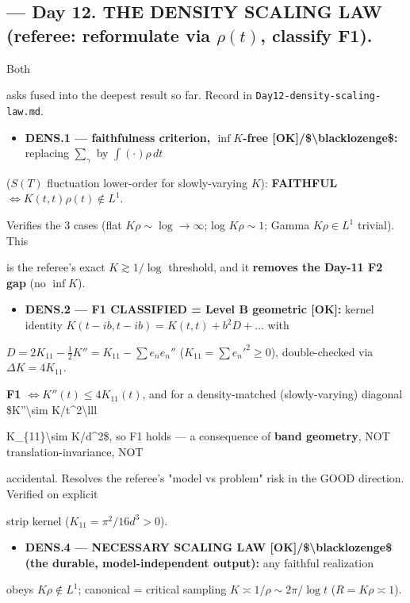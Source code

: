\documentclass[10pt]{article}
\begin{document}
\subsection*{ --- Day 12. THE DENSITY SCALING LAW (referee: reformulate via $\rho(t)$, classify F1).}
Both\par
asks fused into the deepest result so far. Record in \texttt{Day12-density-scaling-law.md}.\par
\begin{itemize}
\item \textbf{DENS.1 --- faithfulness criterion, $\inf K$-free [OK]/\$\textbackslash{}blacklozenge\$:} replacing $\sum_\gamma$ by $\int(\cdot)\rho\,dt$
\end{itemize}
  ($S(T)$ fluctuation lower-order for slowly-varying $K$): \textbf{FAITHFUL $\iff K(t,t)\rho(t)\notin L^1$}.\par
  Verifies the 3 cases (flat $K\rho\sim\log\to\infty$; log $K\rho\sim1$; Gamma $K\rho\in L^1$ trivial). This\par
  is the referee's exact $K\gtrsim1/\log$ threshold, and it \textbf{removes the Day-11 F2 gap} (no $\inf K$).\par
\begin{itemize}
\item \textbf{DENS.2 --- F1 CLASSIFIED = Level B geometric [OK]:} kernel identity $K(t-ib,t-ib)=K(t,t)+b^2D+\dots$ with
\end{itemize}
  $D=2K_{11}-\tfrac12K''=K_{11}-\sum e_ne_n''$ ($K_{11}=\sum e_n'^2\ge0$), double-checked via $\Delta K=4K_{11}$.\par
  \textbf{F1 $\iff K''(t)\le4K_{11}(t)$}, and for a density-matched (slowly-varying) diagonal \$K''\textbackslash{}sim K/t\textasciicircum{}2\textbackslash{}lll\par
  K\_\{11\}\textbackslash{}sim K/d\textasciicircum{}2\$, so F1 holds --- a consequence of \textbf{band geometry}, NOT translation-invariance, NOT\par
  accidental. Resolves the referee's "model vs problem" risk in the GOOD direction. Verified on explicit\par
  strip kernel ($K_{11}=\pi^2/16d^3>0$).\par
\begin{itemize}
\item \textbf{DENS.4 --- NECESSARY SCALING LAW [OK]/\$\textbackslash{}blacklozenge\$ (the durable, model-independent output):} any faithful realization
\end{itemize}
  obeys $K\rho\notin L^1$; canonical = critical sampling $K\asymp1/\rho\sim2\pi/\log t$ ($R=K\rho\asymp1$).\par
\end{document}
